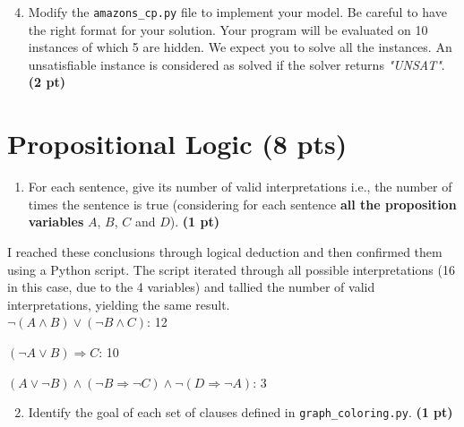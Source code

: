\documentclass[11pt,a4paper]{report}
\begin{document}
\begin{enumerate}
	\setcounter{enumi}{3}
	\item Modify the \texttt{amazons\_cp.py} file to implement your model.
	Be careful to have the right format for your solution. 
	Your program will be evaluated on 10 instances of which 5 are hidden. 
	We expect you to solve all the instances.
	An unsatisfiable instance is considered as solved if the solver returns \textit{"UNSAT"}. \textbf{(2 pt)}
\end{enumerate}

\section{Propositional Logic (8 pts)}

\begin{enumerate}
	\item For each sentence, give its number of valid interpretations i.e., the number of times the sentence is true 
	(considering for each sentence {\bf all the proposition variables} $A$, $B$, $C$ and $D$). \textbf{(1 pt)}
\end{enumerate}

\begin{answers}[4cm]
I reached these conclusions through logical deduction and then confirmed them using a Python script. The script iterated through all possible interpretations (16 in this case, due to the 4 variables) and tallied the number of valid interpretations, yielding the same result. \\
$\neg ( A \land B) \lor (\neg B \land C)$: 12

$(\neg A \lor B) \Rightarrow C$: 10

$( A \lor \neg B) \land (\neg B \Rightarrow \neg C) \land \neg (D \Rightarrow \neg A)$: 3
\end{answers}

\newpage
\begin{enumerate}
	\setcounter{enumi}{1}
	\item Identify the goal of each set of clauses defined in \texttt{graph\_coloring.py}. \textbf{(1 pt)}
\end{enumerate}
\end{document}
